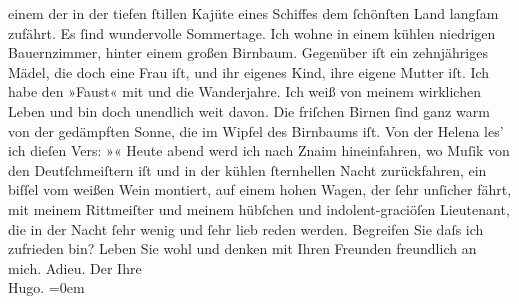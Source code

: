 \begin{ledgroupsized}[t]{13cm}
                    einem der in der tiefen ſtillen Kajüte eines Schiffes dem ſchönſten Land langſam
                    zufährt.\pend
           \pstart
           Es ſind wundervolle Sommertage. Ich wohne in einem kühlen niedrigen Bauernzimmer,
                    hinter einem großen Birnbaum. Gegenüber iſt ein zehnjähriges Mädel, die doch
                    eine Frau iſt, und ihr eigenes Kind, ihre eigene Mutter iſt. Ich habe den
                        »Faust« mit und die Wanderjahre. Ich weiß von meinem {\pb}wirklichen Leben und bin
                    doch unendlich weit davon.\pend
           \pstart
           Die friſchen Birnen ſind ganz warm von der gedämpften Sonne, die im Wipfel des
                    Birnbaums iſt. Von der Helena les’ ich
                    dieſen Vers: »\label{K_L00476_2v}\label{K_L00476_2h}« Heute abend werd ich nach Znaim hineinfahren, wo Muſik von den Deutſchmeiſtern iſt und in der kühlen ſternhellen
                    Nacht zurückfahren, ein biſſel vom weißen Wein montiert, auf einem hohen Wagen,
                    der ſehr {\pb}unſicher fährt, mit
                    meinem Rittmeiſter und meinem hübſchen und indolent-graciöſen Lieutenant, die in
                    der Nacht ſehr wenig und ſehr lieb reden werden. Begreifen Sie daſs ich
                    zufrieden bin?\pend
           \pstart
           Leben Sie wohl und denken mit Ihren Freunden freundlich an mich. Adieu.\pend
           \pstart
           Der Ihre{\\[\baselineskip]}\spacefill\mbox{Hugo.}\pend
           \leftskip=0em{}\endnumbering{}\end{ledgroupsized}  \newcommand{\dateiname}{L00476}\newcommand{\titel}{Hugo von Hofmannsthal an Arthur Schnitzler, 21. [8. 1895]}\newcommand{\editorInnen}{Martin Anton Müller und Gerd-Hermann Susen}
            \footnotesize
\begin{ledgroupsized}[t]{11.5cm}
\end{ledgroupsized}
         
      